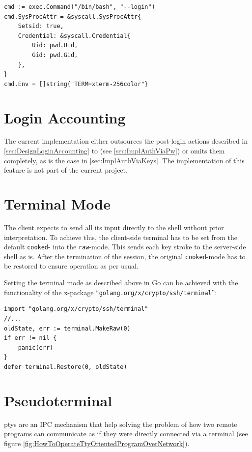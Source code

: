 \documentclass[10pt,a4paper,titlepage,twoside,english,final]{zhawreprt}
\begin{document}
\setlistingGo
\begin{lstlisting}[caption={Starting a process in \gls{Go}},label=lst:StartingAProcessInGo]
cmd := exec.Command("/bin/bash", "--login")
cmd.SysProcAttr = &syscall.SysProcAttr{
	Setsid: true,
	Credential: &syscall.Credential{
		Uid: pwd.Uid,
		Gid: pwd.Gid,
	},
}
cmd.Env = []string{"TERM=xterm-256color"}
\end{lstlisting}


\section{Login Accounting}\label{sec:ImplLoginAccounting}
The current implementation either outsources the post-\gls{login} actions described in \ref{sec:DesignLoginAccounting} to \cite{login}(see \ref{sec:ImplAuthViaPw}) or omits them completely, as is the case in \ref{sec:ImplAuthViaKeys}.
The implementation of this feature is not part of the current project.

\section{Terminal Mode}\label{sec:ImplTerminalMode}
The client expects to send all its input directly to the \gls{shell} without prior interpretation.
To achieve this, the client-side \gls{terminal} has to be set from the default \texttt{cooked}- into the \texttt{raw}-mode\citep[p.1309]{KerriskTLPI}.
This sends each key stroke to the server-side \gls{shell} as is.
After the termination of the session, the original \texttt{cooked}-mode has to be restored to ensure operation as per usual.

Setting the \gls{terminal} mode as described above in \gls{Go} can be achieved with the functionality of the x-package ``\texttt{golang.org/x/crypto/ssh/terminal}'':
\setlistingGo
\begin{lstlisting}[caption={Setting the \gls{terminal} mode in \gls{Go}},label=lst:GoTermMode]
import "golang.org/x/crypto/ssh/terminal"
//...
oldState, err := terminal.MakeRaw(0)
if err != nil {
	panic(err)
}
defer terminal.Restore(0, oldState)
\end{lstlisting}

\section{Pseudoterminal}\label{sec:ImplPseudoterminal}
\glspl{pty} are an \gls{IPC} mechanism that help solving the problem of how two remote programs can communicate as if they were directly connected via a \gls{terminal} (see figure \ref{fig:HowToOperateTtyOrientedProgramOverNetwork}).
\end{document}
